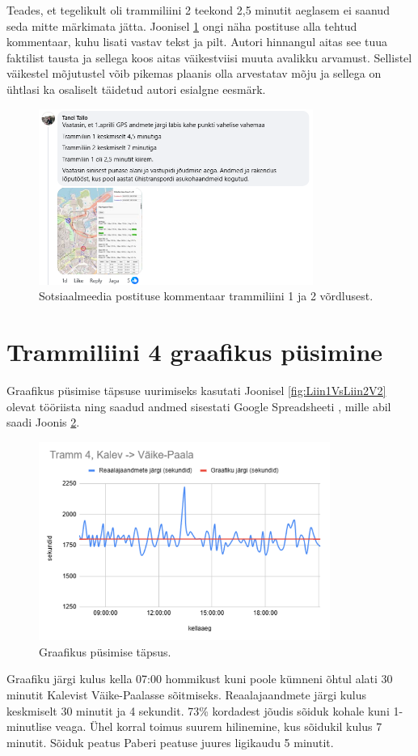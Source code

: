 Teades, et tegelikult oli trammiliini 2 teekond 2,5 minutit aeglasem  ei saanud seda mitte märkimata jätta. Joonisel \ref{fig:facebookiPostitus} ongi näha postituse alla tehtud kommentaar, kuhu lisati vastav tekst ja pilt. Autori hinnangul aitas see tuua faktilist tausta ja sellega koos aitas väikestviisi muuta avalikku arvamust. Sellistel väikestel mõjutustel võib pikemas plaanis olla arvestatav mõju ja sellega on ühtlasi ka osaliselt täidetud autori esialgne eesmärk. 
\begin{figure}[h!]
    \centering
    \includegraphics[width=0.8\textwidth]{figures/facebookiPostitus.png}
    \caption{Sotsiaalmeedia postituse kommentaar trammiliini 1 ja 2 võrdlusest.}
    \label{fig:facebookiPostitus}
\end{figure}

\section{Trammiliini 4 graafikus püsimine}

Graafikus püsimise täpsuse uurimiseks kasutati Joonisel \ref{fig:Liin1VsLiin2V2} olevat tööriista ning saadud andmed sisestati Google Spreadsheeti \cite{Spreadsheet}, mille abil saadi Joonis \ref{fig:kalevVaikePaala}.
\begin{figure}[h!]
    \centering
    \includegraphics[width=0.85\textwidth]{figures/kalev-vaikepaala-kiirused.png}
    \caption{Graafikus püsimise täpsus.}
    \label{fig:kalevVaikePaala}
\end{figure}
Graafiku järgi kulus kella 07:00 hommikust kuni poole kümneni õhtul alati 30 minutit Kalevist Väike-Paalasse sõitmiseks. Reaalajaandmete järgi kulus keskmiselt 30 minutit ja 4 sekundit. 73\% kordadest jõudis sõiduk kohale kuni 1-minutlise veaga. Ühel korral toimus suurem hilinemine, kus sõidukil kulus 7 minutit. Sõiduk peatus Paberi peatuse juures ligikaudu 5 minutit.

